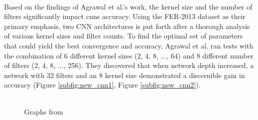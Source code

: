 \\
\indent Based on the findings of Agrawal et al.'s work, the kernel size and the number of filters significantly impact \gls{cnns} accuracy.
Using the FER-2013 dataset as their primary emphasis, two CNN architectures is put forth after a thorough analysis of various kernel sizes and filter counts.
To find the optimal set of parameters that could yield the best convergence and accuracy, Agrawal et al. ran tests with the combination of 6 different kernel sizes (2, 4, 8, ..., 64) and 8 different number of filters (2, 4, 8, ..., 256). 
They discovered that when network depth increased, a network with 32 filters and an 8 kernel size demonstrated a discernible gain in accuracy (Figure \ref{subfig:new_cnn1}, Figure \ref{subfig:new_cnn2}).
\\
\begin{figure}[!ht]
    \centering
    \qquad
    \vspace{0.5cm}
    \\
    \scriptsize{Graphs from \citep{agrawal_2019_using}}
\end{figure}
